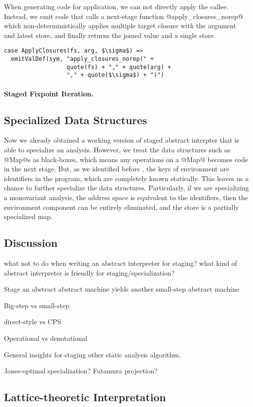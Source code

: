 When generating code for application, we can not directly apply the callee.
Instead, we emit code that calls a next-stage function @apply_closures_norep@ 
which non-deterministically applies multiple target closure with the argument
and latest store, and finally returns the joined value and a single store.

\begin{lstlisting}
case ApplyClosures(fs, arg, $\sigma$) =>
  emitValDef(sym, "apply_closures_norep(" + 
                  quote(fs) + "," + quote(arg) + 
                  "," + quote($\sigma$) + ")")
\end{lstlisting}

\paragraph{Staged Fixpoint Iteration.} 

\subsection{Specialized Data Structures}

Now we already obtained a working version of staged abstract interpter that is able to 
specialize an analysis. However, we treat the data structures such as @Map@s as black-boxes,
which means any operations on a @Map@ becomes code in the next stage.
But, as we identified before , the keys of environment are identifiers in the program,
which are completely known statically. This leaves us a chance to further specialize the 
data structures. Particularly, if we are specializing a monovariant analysis, the address space 
is equivalent to the identifiers, then the environment component can be entirely eliminated, 
and the store is a partially specialized map.

\subsection{Discussion}
what not to do when writing an abstract interpreter for staging?
what kind of abstract interpreter is friendly for staging/specialization?

Stage an abstract abstract machine yields another small-step abstract machine

Big-step vs small-step

direct-style vs CPS

Operational vs denotational

General insights for staging other static analysis algorithm.

\cite{10.1007/3-540-61580-6_11}

Jones-optimal specialization?
Futamura projection?

\subsection{Lattice-theoretic Interpretation}
